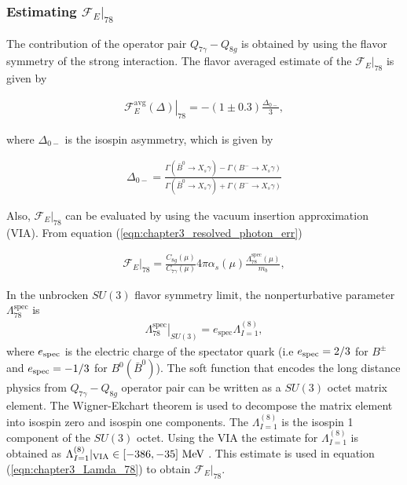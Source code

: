 \subsubsection{Estimating $\mathcal{F}_E|_{78}$}\label{subsec:F_78}
\vspace{-0.2cm}
The contribution of the operator pair $Q_{7\gamma}-Q_{8g}$ is obtained by using the flavor symmetry of the strong interaction. The flavor averaged estimate of the $\mathcal{F}_E|_{78}$ is given by \cite{Benzke:2010js}

\begin{eqnarray}\label{eqn:chapter3_78_contribution}
\left.\mathcal{F}_{E}^{\mathrm{avg}}(\Delta)\right|_{7 8}=-(1 \pm 0.3) \frac{\Delta_{0-}}{3},
\end{eqnarray}

where $\Delta_{0-}$ is the isospin asymmetry, which is given by

\begin{eqnarray}
\Delta_{0-}=\frac{\Gamma\left(\bar{B}^{0} \rightarrow X_{s} \gamma\right)-\Gamma\left(B^{-} \rightarrow X_{s} \gamma\right)}{\Gamma\left(\bar{B}^{0} \rightarrow X_{s} \gamma\right)+\Gamma\left(B^{-} \rightarrow X_{s} \gamma\right)}
\end{eqnarray}

Also, $\mathcal{F}_E|_{78}$ can be evaluated by using the vacuum insertion approximation (VIA). From equation (\ref{eqn:chapter3_resolved_photon_err})
 
\begin{eqnarray}
\mathcal{F}_E|_{78}= \frac{C_{8 g}(\mu)}{C_{7 \gamma}(\mu)} 4 \pi \alpha_{s}(\mu) \frac{\Lambda_{78}^{\mathrm{spec}}(\mu)}{m_{b}}, 
\end{eqnarray}

In the unbrocken $SU(3)$ flavor symmetry limit, the nonperturbative parameter $\Lambda_{78}^{\mathrm{spec}}$ is 
\begin{eqnarray}\label{eqn:chapter3_Lamda_78}
\left.\Lambda_{78}^{\mathrm{spec}}\right|_{S U(3)}=e_{\mathrm{spec}} \Lambda_{I=1}^{(8)},
\end{eqnarray}
where $e_{\rm{spec}}$ is the electric charge of the spectator quark (i.e $e_{\rm{spec}}=2/3$ for $B^{\pm}$ and $e_{\rm{spec}}=-1/3$ for $B^{0}(\bar{B}^{0})$). The soft function that encodes the long distance physics from $Q_{7\gamma}-Q_{8g}$ operator pair can be written as a $SU(3)$ octet matrix element. The Wigner-Ekchart theorem is used to decompose the matrix element  into isospin zero and isospin one components. The $\Lambda_{I=1}^{(8)}$ is the isospin 1 component of the $SU(3)$ octet. Using the VIA the estimate for $\Lambda_{I=1}^{(8)}$ is obtained as $\Lambda_{I=1}^{(8)}|_{\rm{VIA}}\in [-386,-35]\text{ MeV}$ \cite{Benzke:2010js}. This estimate is used in equation (\ref{eqn:chapter3_Lamda_78}) to obtain $\mathcal{F}_E|_{78}$.
\vspace{-0.3cm}
